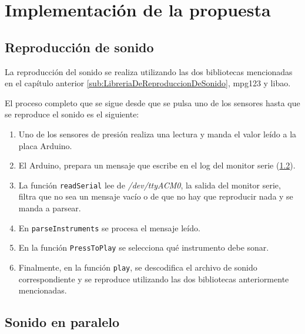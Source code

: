 
\chapter{Implementación de la propuesta}
\label{cha:Implementacion}

    \section{Reproducción de sonido} %
    \label{sec:ReproduccionDeSonido}

        La reproducción del sonido se realiza utilizando las dos bibliotecas mencionadas en el capítulo
        anterior \ref{sub:LibreriaDeReproduccionDeSonido}, mpg123 y libao.

        El proceso completo que se sigue desde que se pulsa uno de los sensores hasta que se reproduce el sonido es el
        siguiente:
        \begin{enumerate}
            \item Uno de los sensores de presión realiza una lectura y manda el valor leído a la placa Arduino.
            \item El Arduino, prepara un mensaje que escribe en el log del monitor serie (\ref{sec:SonidoEnParalelo}).
            \item La función \texttt{readSerial} lee de \textit{/dev/ttyACM0}, la salida del monitor serie, filtra que
            no sea un mensaje vacío o de que no hay que reproducir nada y se manda a parsear.
            \item En \texttt{parseInstruments} se procesa el mensaje leído.
            \item En la función \texttt{PressToPlay} se selecciona qué instrumento debe sonar.
            \item Finalmente, en la función \texttt{play}, se descodifica el archivo de sonido correspondiente y se
            reproduce utilizando las dos bibliotecas anteriormente mencionadas.
        \end{enumerate}


    \section{Sonido en paralelo} %
    \label{sec:SonidoEnParalelo}

